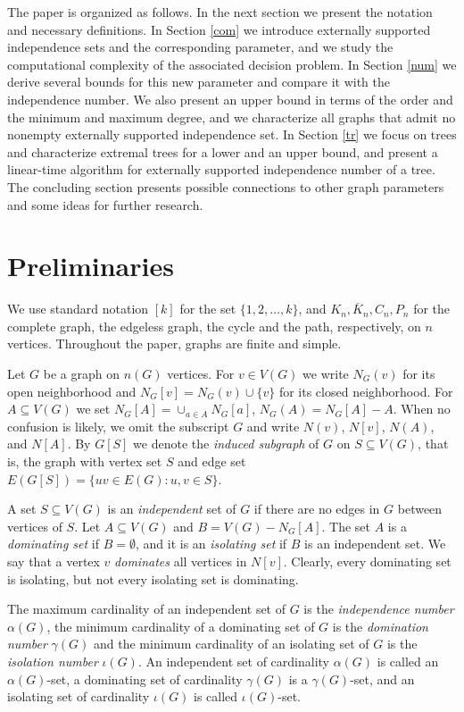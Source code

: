 \documentclass[11pt]{article}
\newcommand{\g}{\gamma}
\newcommand{\io}{\iota}
\newcommand{\al}{\alpha}
\begin{document}
The paper is organized as follows. In the next section we present the notation and necessary definitions. In Section \ref{com} we introduce externally supported independence sets and the corresponding
parameter, and we study the computational complexity of the associated decision problem. In Section \ref{num} we derive several bounds for this new parameter and compare it with the
independence number. We also present an upper bound in terms of the order and the minimum
and maximum degree, and we characterize all graphs that admit no nonempty externally
supported independence set.
In Section \ref{tr} we focus on trees and characterize extremal trees for a lower and an upper bound, and present a linear-time algorithm for externally supported independence number of a tree. The concluding section presents possible  connections to other graph parameters and some ideas for further research.


\section{Preliminaries}

We use standard notation $[k]$ for the set $\{1,2,\dots,k\}$, and $K_n,\overline{K}_n,C_n,P_n$ for the complete graph, the edgeless graph, the cycle and the path, respectively, on $n$ vertices.  Throughout the paper, graphs are finite and simple.

Let $G$ be a graph on $n(G)$ vertices.
For $v\in V(G)$ we write $N_G(v)$ for its open neighborhood and $N_G[v]=N_G(v)\cup \{v\}$ for its closed neighborhood. 
For $A\subseteq V(G)$ we set $N_G[A]=\cup_{a\in A}N_G[a]$, $N_G(A)=N_G[A]-A$. When no confusion is likely, we omit the subscript $G$ and write $N(v)$, $N[v]$, $N(A)$,
and $N[A]$.
By $G[S]$ we denote the \emph{induced
subgraph} of $G$ on $S\subseteq V(G)$, that is, the graph with vertex set $S$ and edge set $E(G[S])=\{uv\in E(G): u,v\in S\}$.

A set $S\subseteq V(G)$ is an \emph{independent} set of $G$ if there are no edges in $G$ between vertices of $S$. Let $A\subseteq V(G)$ and $B=V(G)-N_G[A]$. The set $A$ is a \emph{dominating set} if $B=\emptyset$, and it is an \emph{isolating set} if $B$ is an independent set. We say that a vertex $v$ \emph{dominates} all vertices in $N[v]$. Clearly, every dominating set is isolating, but not every isolating set is dominating. 

The maximum cardinality of an independent set of $G$ is the \emph{independence number} $\al(G)$, the minimum cardinality of a dominating set of $G$ is the \emph{domination number} $\g(G)$ and the minimum cardinality of an isolating set of $G$ is the \emph{isolation number} $\io(G)$. An independent set of cardinality $\al(G)$ is called an $\al
(G)$-set, a dominating set of cardinality $\g(G)$ is a $\g(G)$-set, and an isolating set of cardinality $\io(G)$ is called $\io(G)$-set.
\end{document}
